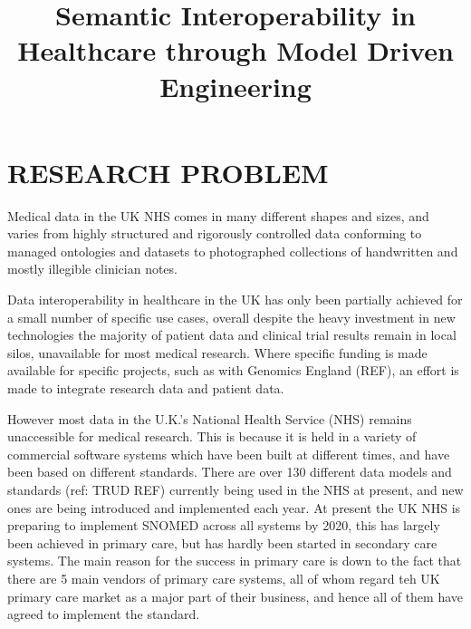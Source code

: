 \documentclass[a4paper,twoside]{article}
\begin{document}
\title{Semantic Interoperability in Healthcare through Model Driven Engineering }

\author{
}

\onecolumn \maketitle \normalsize \vfill

\section{\uppercase{RESEARCH PROBLEM}}
\label{sec:objectives}

\noindent Medical data in the UK NHS comes in many different shapes and sizes, and varies from highly structured and rigorously controlled data conforming to managed ontologies and datasets to photographed collections of handwritten and mostly illegible clinician notes. 

Data interoperability in healthcare in the UK has only been partially achieved for a small number of specific use cases, overall despite the heavy investment in new technologies the majority of patient data and clinical trial results remain in local silos, unavailable for most medical research. Where specific funding is made available for specific projects, such as with Genomics England (REF), an effort is made to integrate research data and patient data.  

However most data in the U.K.'s National Health Service (NHS) remains unaccessible for medical research. This is because it is held in a variety of commercial software systems which have been built at different times, and have been based on different standards.  There are over 130 different data models and standards (ref: TRUD REF) currently being used in the NHS at present, and new ones are being introduced and implemented each year. At present the UK NHS is preparing to implement SNOMED across all systems by 2020, this has largely been achieved in primary care, but has hardly been started in secondary care systems. The main reason for the success in primary care is down to the fact that there are 5 main vendors of primary care systems, all of whom regard teh UK primary care market as a major part of their business, and hence all of them have agreed to implement the standard.  
\end{document}
